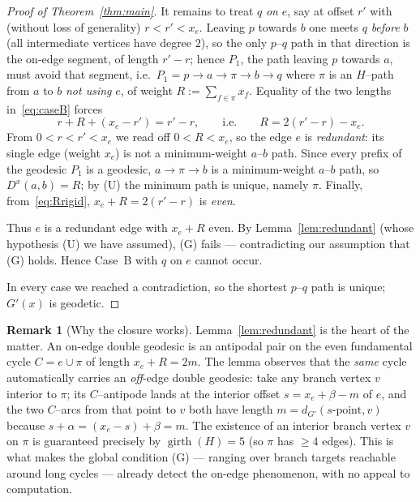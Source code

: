 \documentclass{amsart}
\theoremstyle{definition}
\newtheorem{remark}{Remark}
\begin{document}
\begin{proof}[Proof of Theorem~\ref{thm:main}]
It remains to treat $q$ \emph{on} $e$, say at offset $r'$ with (without loss of
generality) $r<r'<x_e$. Leaving $p$ towards $b$ one meets $q$ \emph{before} $b$
(all intermediate vertices have degree $2$), so the only $p$--$q$ path in that
direction is the on-edge segment, of length $r'-r$; hence $P_1$, the path leaving
$p$ towards $a$, must avoid that segment, i.e.\ $P_1=p\to a\to\pi\to b\to q$ where
$\pi$ is an $H$--path from $a$ to $b$ \emph{not using} $e$, of weight
$R:=\sum_{f\in\pi}x_f$. Equality of the two lengths in~\eqref{eq:caseB} forces
\begin{equation}\label{eq:Rrigid}
 r+R+(x_e-r')=r'-r,\qquad\text{i.e.}\qquad R=2(r'-r)-x_e .
\end{equation}
From $0<r<r'<x_e$ we read off $0<R<x_e$, so the edge $e$ is \emph{redundant}: its
single edge (weight $x_e$) is not a minimum-weight $a$--$b$ path. Since every
prefix of the geodesic $P_1$ is a geodesic, $a\to\pi\to b$ is a minimum-weight
$a$--$b$ path, so $D^x(a,b)=R$; by (U) the minimum path is unique, namely $\pi$.
Finally, from~\eqref{eq:Rrigid}, $x_e+R=2(r'-r)$ is \emph{even}.

Thus $e$ is a redundant edge with $x_e+R$ even. By Lemma~\ref{lem:redundant}
(whose hypothesis (U) we have assumed), (G) fails --- contradicting our
assumption that (G) holds. Hence Case~B with $q$ on $e$ cannot occur.

In every case we reached a contradiction, so the shortest $p$--$q$ path is
unique; $G'(x)$ is geodetic.
\end{proof}

\begin{remark}[Why the closure works]\label{rem:why}
Lemma~\ref{lem:redundant} is the heart of the matter. An on-edge double geodesic
is an antipodal pair on the even fundamental cycle $C=e\cup\pi$ of length
$x_e+R=2m$. The lemma observes that the \emph{same} cycle automatically carries an
\emph{off}-edge double geodesic: take any branch vertex $v$ interior to $\pi$; its
$C$--antipode lands at the interior offset $s=x_e+\beta-m$ of $e$, and the two
$C$--arcs from that point to $v$ both have length $m=d_{G'}(s\text{-point},v)$
because $s+\alpha=(x_e-s)+\beta=m$. The existence of an interior branch vertex $v$
on $\pi$ is guaranteed precisely by $\operatorname{girth}(H)=5$ (so $\pi$ has
$\ge 4$ edges). This is what makes the global condition (G) --- ranging over
branch targets reachable around long cycles --- already detect the on-edge
phenomenon, with no appeal to computation.
\end{remark}
\end{document}
